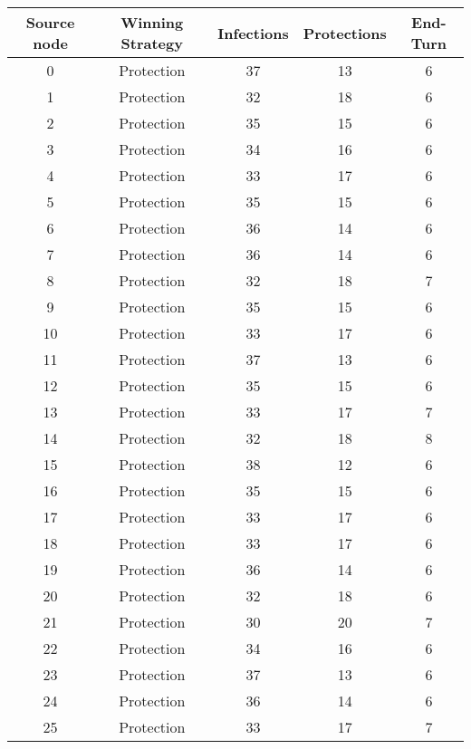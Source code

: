 \documentclass[results.tex]{subfiles}
\begin{document}
\begin{center}
  \begin{tabular}{| c || c | c | c | c |}
    \hline
    {\bfseries Source node} & {\bfseries Winning Strategy} & {\bfseries Infections} & {\bfseries Protections} & {\bfseries End-Turn} \\  %
    \hline\hline
    0 & Protection & 37 & 13 & 6 \\ 
    \hline
    1 & Protection & 32 & 18 & 6 \\ 
    \hline
    2 & Protection & 35 & 15 & 6 \\ 
    \hline
    3 & Protection & 34 & 16 & 6 \\ 
    \hline
    4 & Protection & 33 & 17 & 6 \\ 
    \hline
    5 & Protection & 35 & 15 & 6 \\ 
    \hline
    6 & Protection & 36 & 14 & 6 \\ 
    \hline
    7 & Protection & 36 & 14 & 6 \\ 
    \hline
    8 & Protection & 32 & 18 & 7 \\ 
    \hline
    9 & Protection & 35 & 15 & 6 \\ 
    \hline
    10 & Protection & 33 & 17 & 6 \\ 
    \hline
    11 & Protection & 37 & 13 & 6 \\ 
    \hline
    12 & Protection & 35 & 15 & 6 \\ 
    \hline
    13 & Protection & 33 & 17 & 7 \\ 
    \hline
    14 & Protection & 32 & 18 & 8 \\ 
    \hline
    15 & Protection & 38 & 12 & 6 \\ 
    \hline
    16 & Protection & 35 & 15 & 6 \\ 
    \hline
    17 & Protection & 33 & 17 & 6 \\ 
    \hline
    18 & Protection & 33 & 17 & 6 \\ 
    \hline
    19 & Protection & 36 & 14 & 6 \\ 
    \hline
    20 & Protection & 32 & 18 & 6 \\ 
    \hline
    21 & Protection & 30 & 20 & 7 \\ 
    \hline
    22 & Protection & 34 & 16 & 6 \\ 
    \hline
    23 & Protection & 37 & 13 & 6 \\ 
    \hline
    24 & Protection & 36 & 14 & 6 \\ 
    \hline
    25 & Protection & 33 & 17 & 7 \\ 

\end{tabular}
\end{center}
\end{document}
